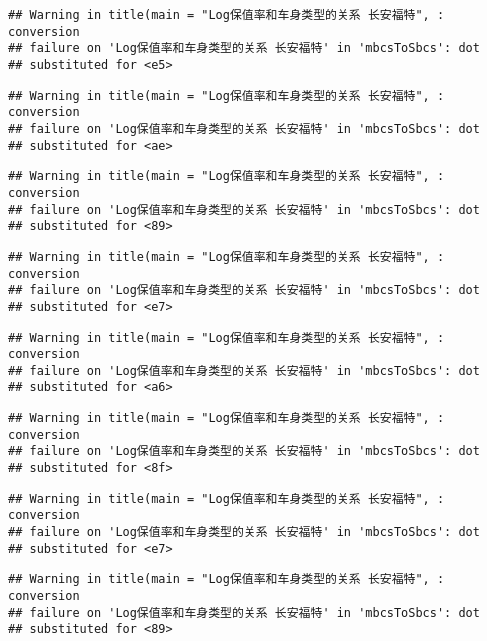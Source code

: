\documentclass[]{article}
\begin{document}
\begin{verbatim}
## Warning in title(main = "Log保值率和车身类型的关系 长安福特", : conversion
## failure on 'Log保值率和车身类型的关系 长安福特' in 'mbcsToSbcs': dot
## substituted for <e5>
\end{verbatim}

\begin{verbatim}
## Warning in title(main = "Log保值率和车身类型的关系 长安福特", : conversion
## failure on 'Log保值率和车身类型的关系 长安福特' in 'mbcsToSbcs': dot
## substituted for <ae>
\end{verbatim}

\begin{verbatim}
## Warning in title(main = "Log保值率和车身类型的关系 长安福特", : conversion
## failure on 'Log保值率和车身类型的关系 长安福特' in 'mbcsToSbcs': dot
## substituted for <89>
\end{verbatim}

\begin{verbatim}
## Warning in title(main = "Log保值率和车身类型的关系 长安福特", : conversion
## failure on 'Log保值率和车身类型的关系 长安福特' in 'mbcsToSbcs': dot
## substituted for <e7>
\end{verbatim}

\begin{verbatim}
## Warning in title(main = "Log保值率和车身类型的关系 长安福特", : conversion
## failure on 'Log保值率和车身类型的关系 长安福特' in 'mbcsToSbcs': dot
## substituted for <a6>
\end{verbatim}

\begin{verbatim}
## Warning in title(main = "Log保值率和车身类型的关系 长安福特", : conversion
## failure on 'Log保值率和车身类型的关系 长安福特' in 'mbcsToSbcs': dot
## substituted for <8f>
\end{verbatim}

\begin{verbatim}
## Warning in title(main = "Log保值率和车身类型的关系 长安福特", : conversion
## failure on 'Log保值率和车身类型的关系 长安福特' in 'mbcsToSbcs': dot
## substituted for <e7>
\end{verbatim}

\begin{verbatim}
## Warning in title(main = "Log保值率和车身类型的关系 长安福特", : conversion
## failure on 'Log保值率和车身类型的关系 长安福特' in 'mbcsToSbcs': dot
## substituted for <89>
\end{verbatim}
\end{document}
